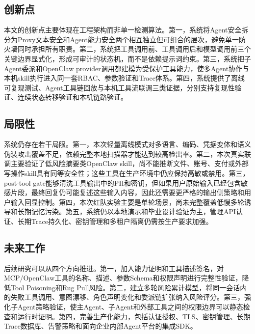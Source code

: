 \documentclass[UTF8,zihao=-4,scheme=chinese,fontset=none]{ctexart}
\begin{document}
\subsection{创新点}

本文的创新点主要体现在工程架构而非单一检测算法。第一，系统将Agent安全拆分为Proxy文本安全和Agent能力安全两个相互独立但可组合的层次，避免单一防火墙同时承担所有职责。第二，系统把工具调用前、工具调用后和模型调用前三个关键边界显式化，形成可审计的状态机，而不是依赖提示词约束。第三，系统把子Agent委派和OpenClaw provider调用都建模为受保护工具能力，使多Agent协作与本机skill执行进入同一套RBAC、参数验证和Trace体系。第四，系统提供了离线可复现测试、Agent工具链回放与本机工具流联调三类证据，分别支持复现性验证、连续状态转移验证和本机链路验证。

\subsection{局限性}

系统仍存在若干局限。第一，本次轻量离线模式对多语言、编码、凭据变体和语义伪装攻击覆盖不足，依赖完整本地扫描器才能达到较高检出率。第二，本次真实联调主要验证了低风险摘要类OpenClaw skill，尚不能推断文件、账号、支付或外部写操作skill具有同等安全性；这些工具在生产环境中仍应保持高敏或禁用。第三，post-tool gate能够清洗工具输出中的PII和密钥，但如果用户原始输入已经包含敏感片段，最终回复仍可能复述这些输入内容，因此还需要更严格的输出侧策略和用户输入回显控制。第四，本次红队实验主要是单轮场景，尚未完整覆盖低慢多轮诱导和长期记忆污染。第五，系统仍以本地演示和毕业设计验证为主，管理API认证、长期Trace持久化、密钥管理和多租户隔离仍需按生产要求加强。

\subsection{未来工作}

后续研究可以从四个方向推进。第一，加入能力证明和工具描述签名，对MCP/OpenClaw工具的名称、描述、参数Schema和权限声明进行完整性验证，降低Tool Poisoning和Rug Pull风险。第二，建立多轮风险累计模型，将同一会话内的失败工具调用、意图漂移、角色声明变化和委派链扩张纳入风险评分。第三，强化子Agent策略验证，使主Agent、子Agent和外部工具之间的权限边界可以静态检查和运行时证明。第四，完善生产化能力，包括认证授权、TLS、密钥管理、长期Trace数据库、告警策略和面向企业内部Agent平台的集成SDK。
\end{document}
